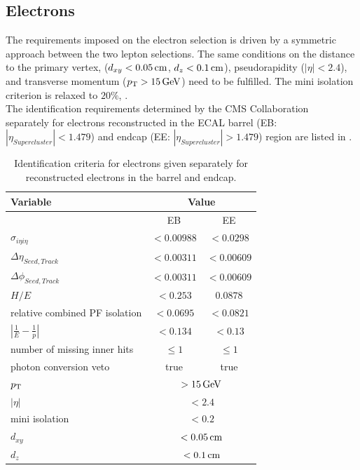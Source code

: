 \subsection{Electrons}
The requirements imposed on the electron selection is driven by a symmetric approach between the two lepton selections. The same conditions on the distance to the primary vertex, ($d_{xy}<0.05\,\text{cm}$, $d_z<0.1\,\text{cm}$), pseudorapidity ($|\eta|<2.4$), and transverse momentum ($p_{\mathrm{T}}>15\,\text{Ge\hspace{-.08em}V}$) need to be fulfilled. The mini isolation criterion is relaxed to $20\%$, .\\
The identification requirements determined by the CMS Collaboration~\cite{ElectronID} separately for electrons reconstructed in the ECAL barrel (EB: $|\eta_{Supercluster}|<1.479$) and endcap (EE: $|\eta_{Supercluster}|>1.479$) region are listed in .
\begin{table}[tbp]
 \centering
 \caption{Identification criteria for electrons given separately for reconstructed electrons in the barrel and endcap.}
 \label{tab:eleID}
 \begin{tabular}{lcc}
  Variable                       & \multicolumn{2}{c}{Value}                   \\\hline
                                 & EB                             & EE         \\\hline
  $\sigma_{i\eta i\eta}$         & $<0.00988$                     & $<0.0298$  \\
  $\Delta\eta_{Seed,Track}$      & $<0.00311$                     & $<0.00609$ \\
  $\Delta\phi_{Seed,Track}$      & $<0.00311$                     & $<0.00609$ \\
  $H/E$                          & $<0.253$                       & $0.0878$   \\
  relative combined PF isolation & $<0.0695$                      & $<0.0821$  \\
  $|\frac{1}{E}-\frac{1}{p}|$    & $<0.134$                       & $<0.13$    \\
  number of missing inner hits   & $\leq1$                        & $\leq1$    \\
  photon conversion veto         & true                           & true       \\\hline
  $p_{\mathrm{T}}$                          & \multicolumn{2}{c}{$>15\,\text{Ge\hspace{-.08em}V}$}               \\
  $|\eta|$                       & \multicolumn{2}{c}{$<2.4$}                  \\
  mini isolation                 & \multicolumn{2}{c}{$<0.2$}                  \\
  $d_{xy}$                       & \multicolumn{2}{c}{$<0.05\,\text{cm}$}              \\
  $d_z$                          & \multicolumn{2}{c}{$<0.1\,\text{cm}$}               \\\hline
 \end{tabular}
\end{table}

